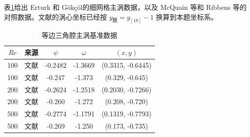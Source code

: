\documentclass[UTF8,a4paper,11pt]{ctexart}
\begin{document}
表\ref{tab:tri-primary}给出 Erturk 和 G\"ok\c{c}\"ol\cite{Erturk2007}的细网格主涡数据，以及 McQuain 等和 Ribbens 等\cite{McQuain1994,Ribbens1994}的对照数据。文献\cite{Erturk2007}的涡心坐标已经按 \(y_{\text{题}}=y_{[18]}-1\) 换算到本题坐标系。

\begin{table}[htbp]
\centering
\caption{等边三角腔主涡基准数据}
\label{tab:tri-primary}
\begin{tabular}{clccc}
\toprule
\(Re\) & 来源 & \(\psi\) & \(\omega\) & \((x,y)\) \\
\midrule
100 & 文献\cite{Erturk2007} & -0.2482 & -1.3669 & (0.3315, -0.6445) \\
100 & 文献\cite{McQuain1994,Ribbens1994} & -0.247 & -1.373 & (0.329, -0.645) \\
200 & 文献\cite{Erturk2007} & -0.2624 & -1.2518 & (0.2030, -0.7266) \\
200 & 文献\cite{McQuain1994,Ribbens1994} & -0.260 & -1.272 & (0.208, -0.720) \\
500 & 文献\cite{Erturk2007} & -0.2774 & -1.1791 & (0.1319, -0.7793) \\
500 & 文献\cite{McQuain1994,Ribbens1994} & -0.269 & -1.250 & (0.173, -0.735) \\
\bottomrule
\end{tabular}
\end{table}
\end{document}

